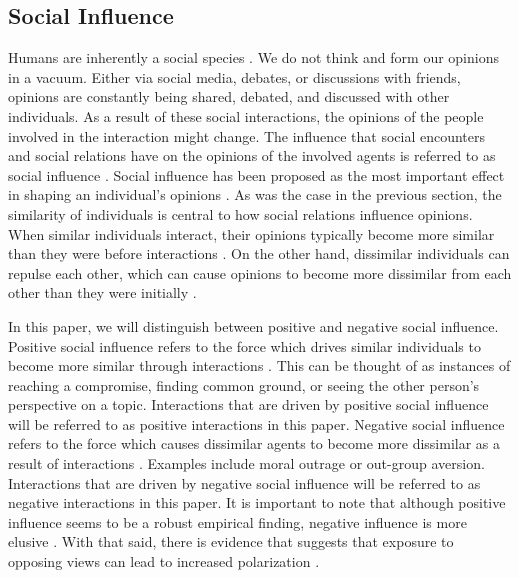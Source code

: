 \documentclass[11pt]{article}
\begin{document}
\subsection{Social Influence}
Humans are inherently a social species \cite{kurzban2015evolution}. We do not think and form our opinions in a vacuum. Either via social media, debates, or discussions with friends, opinions are constantly being shared, debated, and discussed with other individuals. 
As a result of these social interactions, the opinions of the people involved in the interaction might change. 
The influence that social encounters and social relations have on the opinions of the involved agents is referred to as social influence \cite{friedkin_social_1990}. Social influence has been proposed as the most important effect in shaping an individual's opinions \cite{chacoma_opinion_2015, flache_between_2018}. As was the case in the previous section, the similarity of individuals is central to how social relations influence opinions. When similar individuals interact, their opinions typically become more similar than they were before interactions \cite{takacs_discrepancy_2016}. On the other hand, dissimilar individuals can repulse each other, which can cause opinions to become more dissimilar from each other than they were initially \cite{hilmert2006positive, cikara2014neuroscience}.  

In this paper, we will distinguish between positive and negative social influence. Positive social influence refers to the force which drives similar individuals to become more similar through interactions \cite{flache_models_2017,levin_dynamics_2021}. 
This can be thought of as instances of reaching a compromise, finding common ground, or seeing the other person's perspective on a topic. Interactions that are driven by positive social influence will be referred to as positive interactions in this paper. Negative social influence refers to the force which causes dissimilar agents to become more dissimilar as a result of interactions \cite{flache_models_2017}. 
Examples include moral outrage or out-group aversion. Interactions that are driven by negative social influence will be referred to as negative interactions in this paper. It is important to note that although positive influence seems to be a robust empirical finding, negative influence is more elusive \cite{flache_models_2017,takacs_is_2014,turner_paths_2018}. 
With that said, there is evidence that suggests that exposure to opposing views can lead to increased polarization \cite{bail_exposure_2018, hilmert2006positive, cikara2014neuroscience}.
\end{document}
